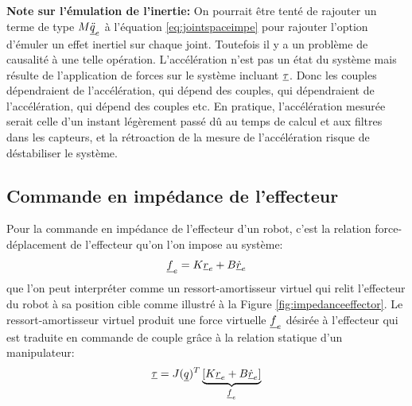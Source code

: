 \textbf{Note sur l'émulation de l'inertie: } On pourrait être tenté de rajouter un terme de type $M \underline{\ddot{q}}_e$ à l'équation \eqref{eq:jointspaceimpe} pour rajouter l'option d'émuler un effet inertiel sur chaque joint. Toutefois il y a un problème de causalité à une telle opération. L'accélération n'est pas un état du système mais résulte de l'application de forces sur le système incluant $\underline{\tau}$. Donc les couples dépendraient de l'accélération, qui dépend des couples, qui dépendraient de l'accélération, qui dépend des couples etc. En pratique, l'accélération mesurée serait celle d'un instant légèrement passé dû au temps de calcul et aux filtres dans les capteurs, et la rétroaction de la mesure de l'accélération risque de déstabiliser le système.


\subsection{Commande en impédance de l'effecteur}
\label{sec:effimpcontrol}

Pour la commande en impédance de l'effecteur d'un robot, c'est la relation force-déplacement de l'effecteur qu'on l'on impose au système:
\begin{align}
\underline{f}_e  =  K \underline{r}_e + B \underline{\dot{r}}_e 
\end{align}
que l'on peut interpréter comme un ressort-amortisseur virtuel qui relit l'effecteur du robot à sa position cible comme illustré à la Figure \ref{fig:impedanceeffector}. Le ressort-amortisseur virtuel produit une force virtuelle $\underline{f}_e$ désirée à l'effecteur qui est traduite en commande de couple grâce à la relation statique d'un manipulateur:
\begin{align}
\underline{\tau} = J(\underline{q})^T  \underbrace{ \left[ K \underline{r}_e + B \underline{\dot{r}}_e \right] }_{\underline{f}_e}
\end{align}

